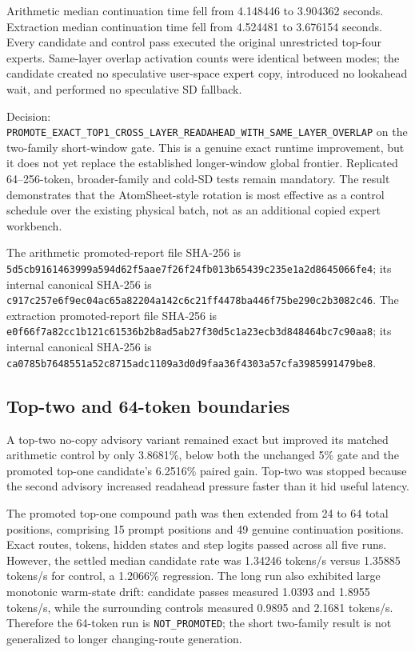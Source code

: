Arithmetic median continuation time fell from 4.148446 to 3.904362 seconds.
Extraction median continuation time fell from 4.524481 to 3.676154 seconds.
Every candidate and control pass executed the original unrestricted top-four
experts.  Same-layer overlap activation counts were identical between modes;
the candidate created no speculative user-space expert copy, introduced no
lookahead wait, and performed no speculative SD fallback.

Decision:
\texttt{PROMOTE\_EXACT\_TOP1\_CROSS\_LAYER\_READAHEAD\_WITH\_SAME\_LAYER\_OVERLAP}
on the two-family short-window gate.  This is a genuine exact runtime
improvement, but it does not yet replace the established longer-window global
frontier.  Replicated 64--256-token, broader-family and cold-SD tests remain
mandatory.  The result demonstrates that the AtomSheet-style rotation is most
effective as a control schedule over the existing physical batch, not as an
additional copied expert workbench.

The arithmetic promoted-report file SHA-256 is
\texttt{5d5cb9161463999a594d62f5aae7f26f24fb013b65439c235e1a2d8645066fe4};
its internal canonical SHA-256 is
\texttt{c917c257e6f9ec04ac65a82204a142c6c21ff4478ba446f75be290c2b3082c46}.
The extraction promoted-report file SHA-256 is
\texttt{e0f66f7a82cc1b121c61536b2b8ad5ab27f30d5c1a23ecb3d848464bc7c90aa8};
its internal canonical SHA-256 is
\texttt{ca0785b7648551a52c8715adc1109a3d0d9faa36f4303a57cfa3985991479be8}.

\subsection{Top-two and 64-token boundaries}

A top-two no-copy advisory variant remained exact but improved its matched
arithmetic control by only 3.8681\%, below both the unchanged 5\% gate and the
promoted top-one candidate's 6.2516\% paired gain.  Top-two was stopped because
the second advisory increased readahead pressure faster than it hid useful
latency.

The promoted top-one compound path was then extended from 24 to 64 total
positions, comprising 15 prompt positions and 49 genuine continuation
positions.  Exact routes, tokens, hidden states and step logits passed across
all five runs.  However, the settled median candidate rate was 1.34246 tokens/s
versus 1.35885 tokens/s for control, a 1.2066\% regression.  The long run also
exhibited large monotonic warm-state drift: candidate passes measured 1.0393
and 1.8955 tokens/s, while the surrounding controls measured 0.9895 and 2.1681
tokens/s.  Therefore the 64-token run is \texttt{NOT\_PROMOTED}; the short
two-family result is not generalized to longer changing-route generation.

